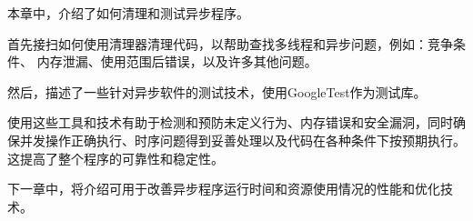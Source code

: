 本章中，介绍了如何清理和测试异步程序。

首先接扫如何使用清理器清理代码，以帮助查找多线程和异步问题，例如：竞争条件、 内存泄漏、使用范围后错误，以及许多其他问题。

然后，描述了一些针对异步软件的测试技术，使用GoogleTest作为测试库。

使用这些工具和技术有助于检测和预防未定义行为、内存错误和安全漏洞，同时确保并发操作正确执行、时序问题得到妥善处理以及代码在各种条件下按预期执行。这提高了整个程序的可靠性和稳定性。

下一章中，将介绍可用于改善异步程序运行时间和资源使用情况的性能和优化技术。